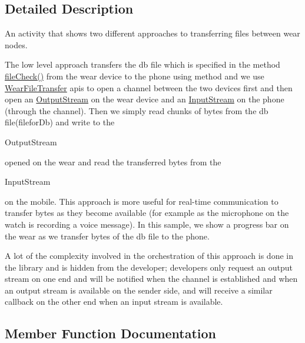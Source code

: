 \subsection{Detailed Description}
An activity that shows two different approaches to transferring files between wear nodes.

The low level approach transfers the db file which is specified in the method \hyperlink{classcom_1_1example_1_1android_1_1wearable_1_1wcldemo_1_1pages_1_1FileTransferActivity_ab5d34a68bab9687e8c6c6728078b1787}{file\+Check()} from the wear device to the phone using method and we use \hyperlink{}{Wear\+File\+Transfer} apis to open a channel between the two devices first and then open an \hyperlink{}{Output\+Stream} on the wear device and an \hyperlink{}{Input\+Stream} on the phone (through the channel). Then we simply read chunks of bytes from the db file(filefor\+Db) and write to the
\begin{DoxyCode}
OutputStream 
\end{DoxyCode}
 opened on the wear and read the transferred bytes from the 
\begin{DoxyCode}
InputStream 
\end{DoxyCode}
 on the mobile. This approach is more useful for real-\/time communication to transfer bytes as they become available (for example as the microphone on the watch is recording a voice message). In this sample, we show a progress bar on the wear as we transfer bytes of the db file to the phone.

A lot of the complexity involved in the orchestration of this approach is done in the library and is hidden from the developer; developers only request an output stream on one end and will be notified when the channel is established and when an output stream is available on the sender side, and will receive a similar callback on the other end when an input stream is available. 

\subsection{Member Function Documentation}
